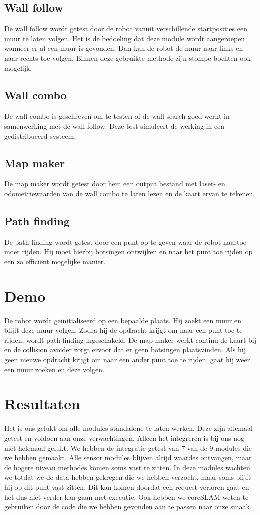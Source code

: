 \documentclass[a4paper,10pt]{article}
\begin{document}
\subsection{Wall follow}
De wall follow wordt getest door de robot vanuit verschillende startposities een muur te laten volgen. Het is de bedoeling dat deze module wordt aangeroepen wanneer er al een muur is gevonden. Dan kan de robot de muur naar links en naar rechts toe volgen. Binnen deze gebruikte methode zijn stompe bochten ook mogelijk.

\subsection{Wall combo}
De wall combo is geschreven om te testen of de wall search goed werkt in samenwerking met de wall follow. Deze test simuleert
de werking in een gedistribueerd systeem.

\subsection{Map maker}
De map maker wordt getest door hem een output bestand met laser- en odometriewaarden van de wall combo te laten lezen en de kaart ervan te tekenen.

\subsection{Path finding}
De path finding wordt getest door een punt op te geven waar de robot naartoe moet rijden. Hij moet hierbij botsingen ontwijken en naar het punt toe rijden op een zo effici\"{e}nt mogelijke manier.

\section{Demo}
De robot wordt ge\"{i}nitialiseerd op een bepaalde plaats. Hij zoekt een muur en blijft deze muur volgen. Zodra hij de opdracht krijgt om naar een punt toe te rijden, wordt path finding ingeschakeld. De map maker werkt continu de kaart bij en de collision avoider zorgt ervoor dat er geen botsingen plaatsvinden. Als hij geen nieuwe opdracht krijgt om naar een ander punt toe te rijden, gaat hij weer een muur zoeken en deze volgen.

\section{Resultaten}
Het is ons gelukt om alle modules standalone te laten werken. Deze zijn allemaal getest en voldoen aan onze verwachtingen. Alleen het integreren is bij ons nog niet helemaal gelukt. We hebben de integratie getest van 7 van de 9 modules die we hebben gemaakt. Alle sensor modules blijven altijd waardes ontvangen, maar de hogere niveau methodes komen soms vast te zitten. In deze modules wachten we totdat we de data hebben gekregen die we hebben verzocht, maar soms blijft hij op dit punt vast zitten. Dit kan komen doordat een request verloren gaat en het dus niet verder kan gaan met executie. Ook hebben we coreSLAM weten te gebruiken door de code die we hebben gevonden aan te passen naar onze smaak.
\end{document}
